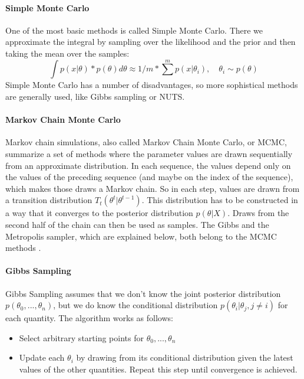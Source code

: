 \documentclass{article}
\begin{document}
\paragraph{Simple Monte Carlo}
One of the most basic methods is called Simple Monte Carlo. There we approximate the integral by sampling over the likelihood and the prior and then taking the mean over the samples:
\begin{equation}
\int p(x|\theta) * p(\theta) d \theta \approx 1/m * \sum^m p(x|\theta_i),\quad \theta_i \sim p(\theta)
\end{equation}
Simple Monte Carlo has a number of disadvantages, so more sophistical methods are generally used, like Gibbs sampling or NUTS.
\paragraph{Markov Chain Monte Carlo}
Markov chain simulations, also called Markov Chain Monte Carlo, or MCMC, summarize a set of methods where the parameter values are drawn sequentially from an approximate distribution. In each sequence, the values depend only on the values of the preceding sequence (and maybe on the index of the sequence), which makes those draws a Markov chain. So in each step, values are drawn from a transition distribution $T_t(\theta^t|\theta^{t-1})$. This distribution has to be constructed in a way that it converges to the posterior distribution $p(\theta|X)$. Draws from the second half of the chain can then be used as samples. The Gibbs and the Metropolis sampler, which are explained below, both belong to the MCMC methods \cite{1439840954}.
\paragraph{Gibbs Sampling}
Gibbs Sampling assumes that we don't know the joint posterior distribution $p(\theta_0,...,\theta_n)$, but we do know the conditional distribution $p(\theta_i | \theta_j, j \neq i)$ for each quantity.
The algorithm works as follows:
\begin{itemize}
	\item Select arbitrary starting points for $\theta_0,...,\theta_n$
	\item Update each $\theta_i$ by drawing from its conditional distribution given the latest values of the other quantities. Repeat this step until convergence is achieved.
\end{itemize}
\cite{Martz1994}
\end{document}
